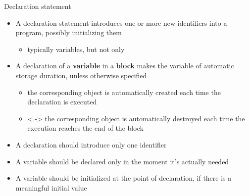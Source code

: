 \begin{frame}{Declaration statement}

  \begin{itemize}[<+->]
  \item A declaration statement introduces one or more new identifiers into a
    \Cpp{} program, possibly initializing them
    \begin{itemize}
    \item typically variables, but not only
    \end{itemize}

  \item A declaration of a \textbf{variable} in a \textbf{block} makes the
    variable of \alert{automatic storage duration}, unless otherwise specified
    \begin{itemize}
    \item the corresponding object is automatically created each time the
      declaration is executed
    \item<.-> the corresponding object is automatically destroyed each time the
      execution reaches the end of the block
    \end{itemize}

  \item A declaration should introduce only one identifier

  \item A variable should be declared only in the moment it's actually needed

  \item A variable should be initialized at the point of declaration, if there
    is a meaningful initial value

  \end{itemize}

\end{frame}

